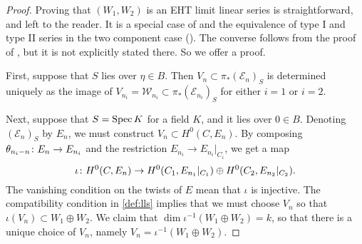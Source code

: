 \begin{proof}
  Proving that $(W_1, W_2)$ is an EHT limit linear series is straightforward, and left to the reader.
  It is a special case of \cite[Theorem~4.3.4]{oss:14} and the equivalence of type I and type II series in the two component case (\cite[Remark~3.4.15]{oss:14}).
  The converse follows from the proof of \cite[Theorem~4.3.4]{oss:14}, but it is not explicitly stated there.
  So we offer a proof.
  
  First, suppose that $S$ lies over $\eta \in B$.
  Then $V_n \subset \pi_* (\mathcal E_n)_S$ is determined uniquely as the image of $V_{n_i} = \mathcal W_{n_i} \subset \pi_* (\mathcal E_{n_i})_S$ for either $i = 1$ or $i = 2$.

  Next, suppose that $S = \operatorname{Spec} K$ for a field $K$, and it lies over $0 \in B$.
  Denoting $(\mathcal E_n)_S$ by $E_n$, we must construct $V_n \subset H^0(C, E_n)$.
  By composing $\theta_{n_i-n} {\colon} E_n \to E_{n_i}$ and the restriction $E_{n_i} \to E_{n_i}|_{C_i}$, we get a map
  \[ \iota {\colon} H^0(C, E_n) \to H^0(C_1, E_{n_1}|_{C_1}) \oplus H^0(C_2, E_{n_2}|_{C_2}). \]
  The vanishing condition on the twists of $E$ mean that $\iota$ is injective.
  The compatibility condition in \autoref{def:lls} implies that we must choose $V_n$ so that $\iota (V_n) \subset W_1 \oplus W_2$.
  We claim that $\dim \iota^{-1}(W_1 \oplus W_2) = k$, so that there is a unique choice of $V_n$, namely $V_n = \iota^{-1}(W_1 \oplus W_2)$.


\end{proof}
